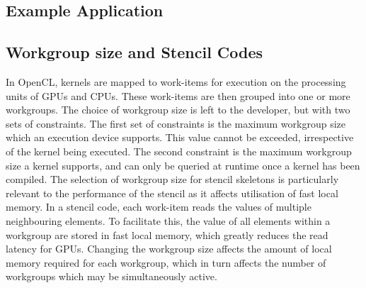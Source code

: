\subsection{Example Application}



\subsection{Workgroup size and Stencil Codes}


In OpenCL, kernels are mapped to work-items for execution on the
processing units of GPUs and CPUs. These work-items are then grouped
into one or more workgroups. The choice of workgroup size is left to
the developer, but with two sets of constraints. The first set of
constraints is the maximum workgroup size which an execution device
supports. This value cannot be exceeded, irrespective of the kernel
being executed. The second constraint is the maximum workgroup size a
kernel supports, and can only be queried at runtime once a kernel has
been compiled. The selection of workgroup size for stencil skeletons
is particularly relevant to the performance of the stencil as it
affects utilisation of fast local memory. In a stencil code, each
work-item reads the values of multiple neighbouring elements. To
facilitate this, the value of all elements within a workgroup are
stored in fast local memory, which greatly reduces the read latency
for GPUs. Changing the workgroup size affects the amount of local
memory required for each workgroup, which in turn affects the number
of workgroups which may be simultaneously active. 




